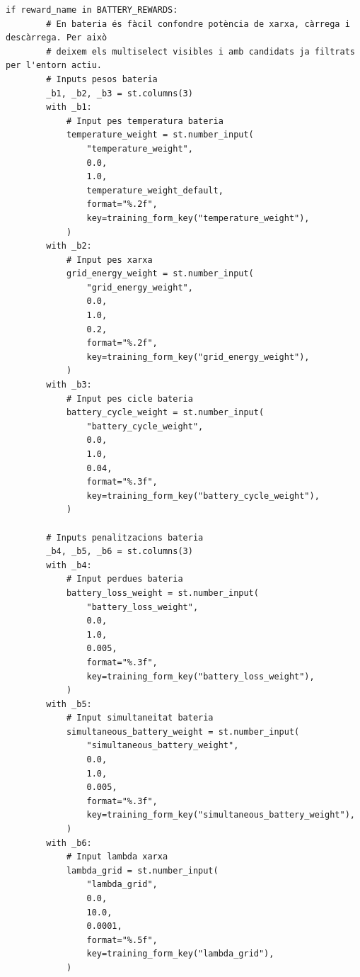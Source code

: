 \documentclass[10pt,a4paper]{article}
\begin{document}
\begin{lstlisting}[style=studioPython,caption={page\_components/training\_rewards.py},label={lst:page-components-training-rewards-py}]
    if reward_name in BATTERY_REWARDS:
        # En bateria és fàcil confondre potència de xarxa, càrrega i descàrrega. Per això
        # deixem els multiselect visibles i amb candidats ja filtrats per l'entorn actiu.
        # Inputs pesos bateria
        _b1, _b2, _b3 = st.columns(3)
        with _b1:
            # Input pes temperatura bateria
            temperature_weight = st.number_input(
                "temperature_weight",
                0.0,
                1.0,
                temperature_weight_default,
                format="%.2f",
                key=training_form_key("temperature_weight"),
            )
        with _b2:
            # Input pes xarxa
            grid_energy_weight = st.number_input(
                "grid_energy_weight",
                0.0,
                1.0,
                0.2,
                format="%.2f",
                key=training_form_key("grid_energy_weight"),
            )
        with _b3:
            # Input pes cicle bateria
            battery_cycle_weight = st.number_input(
                "battery_cycle_weight",
                0.0,
                1.0,
                0.04,
                format="%.3f",
                key=training_form_key("battery_cycle_weight"),
            )

        # Inputs penalitzacions bateria
        _b4, _b5, _b6 = st.columns(3)
        with _b4:
            # Input perdues bateria
            battery_loss_weight = st.number_input(
                "battery_loss_weight",
                0.0,
                1.0,
                0.005,
                format="%.3f",
                key=training_form_key("battery_loss_weight"),
            )
        with _b5:
            # Input simultaneitat bateria
            simultaneous_battery_weight = st.number_input(
                "simultaneous_battery_weight",
                0.0,
                1.0,
                0.005,
                format="%.3f",
                key=training_form_key("simultaneous_battery_weight"),
            )
        with _b6:
            # Input lambda xarxa
            lambda_grid = st.number_input(
                "lambda_grid",
                0.0,
                10.0,
                0.0001,
                format="%.5f",
                key=training_form_key("lambda_grid"),
            )


\end{lstlisting}
\end{document}
